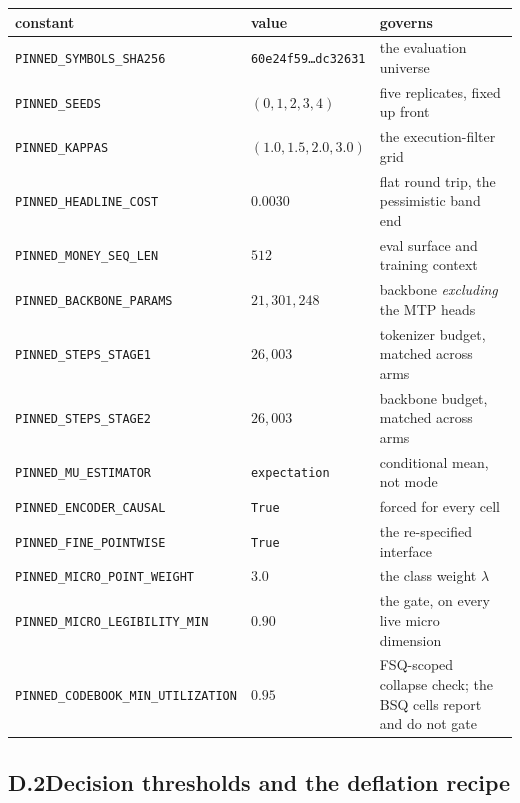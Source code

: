 \begin{center}
\small
\begin{tabularx}{\linewidth}{llX}
\toprule
constant & value & governs \\
\midrule
\texttt{PINNED\_SYMBOLS\_SHA256} & \texttt{60e24f59\ldots dc32631} & the evaluation universe \\
\texttt{PINNED\_SEEDS} & $(0,1,2,3,4)$ & five replicates, fixed up front \\
\texttt{PINNED\_KAPPAS} & $(1.0, 1.5, 2.0, 3.0)$ & the execution-filter grid \\
\texttt{PINNED\_HEADLINE\_COST} & $0.0030$ & flat round trip, the pessimistic band end \\
\texttt{PINNED\_MONEY\_SEQ\_LEN} & $512$ & eval surface and training context \\
\texttt{PINNED\_BACKBONE\_PARAMS} & $21{,}301{,}248$ & backbone \emph{excluding} the MTP heads \\
\texttt{PINNED\_STEPS\_STAGE1} & $26{,}003$ & tokenizer budget, matched across arms \\
\texttt{PINNED\_STEPS\_STAGE2} & $26{,}003$ & backbone budget, matched across arms \\
\texttt{PINNED\_MU\_ESTIMATOR} & \texttt{expectation} & conditional mean, not mode \\
\texttt{PINNED\_ENCODER\_CAUSAL} & \texttt{True} & forced for every cell \\
\texttt{PINNED\_FINE\_POINTWISE} & \texttt{True} & the re-specified interface \\
\texttt{PINNED\_MICRO\_POINT\_WEIGHT} & $3.0$ & the class weight $\lambda$ \\
\texttt{PINNED\_MICRO\_LEGIBILITY\_MIN} & $0.90$ & the gate, on every live micro dimension \\
\texttt{PINNED\_CODEBOOK\_MIN\_UTILIZATION} & $0.95$ & FSQ-scoped collapse check; the BSQ
 cells report and do not gate \\
\bottomrule
\end{tabularx}
\end{center}

\subsection*{D.2\quad Decision thresholds and the deflation recipe}


